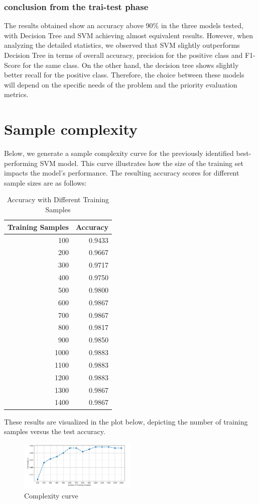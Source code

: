 \documentclass{sbrt}
\begin{document}
\subsubsection{conclusion from the trai-test phase}

The results obtained show an accuracy above 90\% in the three models tested, with Decision Tree and SVM achieving almost equivalent results. However, when analyzing the detailed statistics, we observed that SVM slightly outperforms Decision Tree in terms of overall accuracy, precision for the positive class and F1-Score for the same class. On the other hand, the decision tree shows slightly better recall for the positive class. Therefore, the choice between these models will depend on the specific needs of the problem and the priority evaluation metrics.

\section{Sample complexity}

Below, we generate a sample complexity curve for the previously identified best-performing SVM model. This curve illustrates how the size of the training set impacts the model's performance.
The resulting accuracy scores for different sample sizes are as follows:

\begin{table}[H]
  \centering
  \caption{Accuracy with Different Training Samples}
    \begin{tabular}{rr}
    \toprule
    \textbf{Training Samples} & \textbf{Accuracy} \\
    \midrule
    100   & 0.9433 \\
    200   & 0.9667 \\
    300   & 0.9717 \\
    400   & 0.9750 \\
    500   & 0.9800 \\
    600   & 0.9867 \\
    700   & 0.9867 \\
    800   & 0.9817 \\
    900   & 0.9850 \\
    1000  & 0.9883 \\
    1100  & 0.9883 \\
    1200  & 0.9883 \\
    1300  & 0.9867 \\
    1400  & 0.9867 \\
    \bottomrule
    \end{tabular}%
  \label{tab:addlabel}%
\end{table}%

These results are visualized in the plot below, depicting the number of training samples versus the test accuracy.

\begin{figure}[H]
    \centering
    \includegraphics[width=0.5\textwidth]{images/complexity_curve.png}
    \caption{Complexity curve}
    \label{fig:example}
\end{figure}\textbf{}
\end{document}
